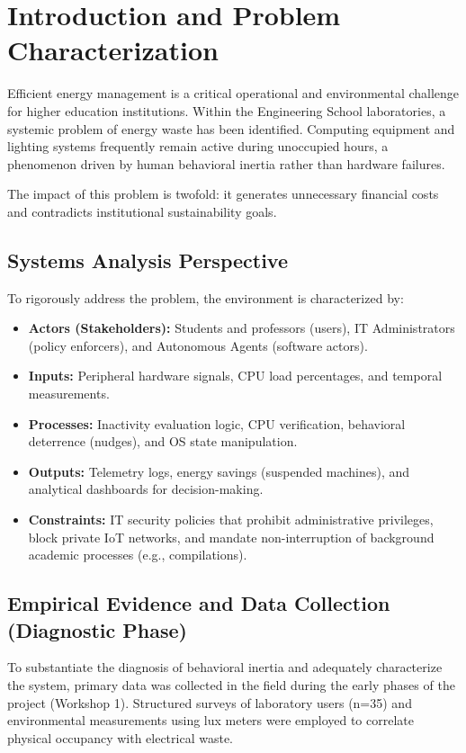 \documentclass[12pt,a4paper]{article}
\begin{document}
\newpage
\tableofcontents
\newpage
\listoffigures
\newpage
\listoftables
\newpage


\section{Introduction and Problem Characterization}
Efficient energy management is a critical operational and environmental challenge for higher education institutions. Within the Engineering School laboratories, a systemic problem of energy waste has been identified. Computing equipment and lighting systems frequently remain active during unoccupied hours, a phenomenon driven by human behavioral inertia rather than hardware failures. 

The impact of this problem is twofold: it generates unnecessary financial costs and contradicts institutional sustainability goals. 

\subsection{Systems Analysis Perspective}
To rigorously address the problem, the environment is characterized by:
\begin{itemize}[leftmargin=1.2cm]
    \item \textbf{Actors (Stakeholders):} Students and professors (users), IT Administrators (policy enforcers), and Autonomous Agents (software actors).
    \item \textbf{Inputs:} Peripheral hardware signals, CPU load percentages, and temporal measurements.
    \item \textbf{Processes:} Inactivity evaluation logic, CPU verification, behavioral deterrence (nudges), and OS state manipulation.
    \item \textbf{Outputs:} Telemetry logs, energy savings (suspended machines), and analytical dashboards for decision-making.
    \item \textbf{Constraints:} IT security policies that prohibit administrative privileges, block private IoT networks, and mandate non-interruption of background academic processes (e.g., compilations).
\end{itemize}

\subsection{Empirical Evidence and Data Collection (Diagnostic Phase)}
To substantiate the diagnosis of behavioral inertia and adequately characterize the system, primary data was collected in the field during the early phases of the project (Workshop 1). Structured surveys of laboratory users (n=35) and environmental measurements using lux meters were employed to correlate physical occupancy with electrical waste.
\end{document}
